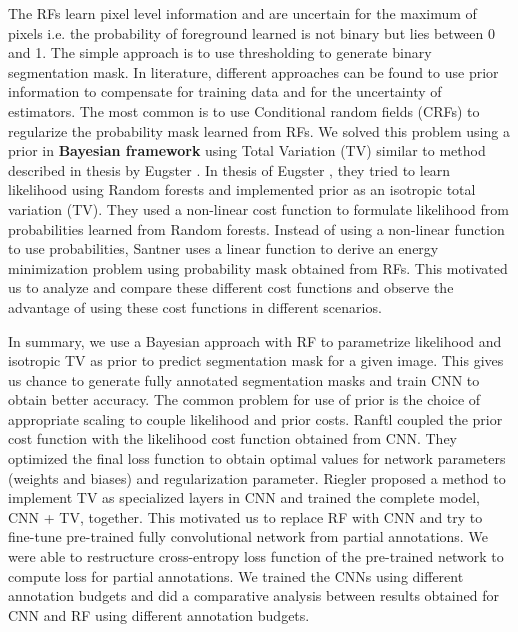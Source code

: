 The RFs learn pixel level information and are uncertain for the maximum of pixels i.e. the probability of foreground learned is not binary but lies between 0 and 1. The simple approach is to use thresholding to generate binary segmentation mask. In literature, different approaches can be found to use prior information to compensate for training data and for the uncertainty of estimators. The most common is to use Conditional random fields (CRFs) to regularize the probability mask learned from RFs. We solved this problem using a prior in \textbf{Bayesian framework} using Total Variation (TV) similar to method described in thesis by Eugster \cite{dominic}. In thesis of Eugster \cite{dominic}, they tried to learn likelihood using Random forests and implemented prior as an isotropic total variation (TV). They used a non-linear cost function to formulate likelihood from probabilities learned from Random forests. Instead of using a non-linear function to use probabilities, Santner \cite{santner:2009} uses a linear function to derive an energy minimization problem using probability mask obtained from RFs. This motivated us to analyze and compare these different cost functions and observe the advantage of using these cost functions in different scenarios. \par

In summary, we use a Bayesian approach with RF to parametrize likelihood and isotropic TV as prior to predict segmentation mask for a given image. This gives us chance to generate fully annotated segmentation masks and train CNN to obtain better accuracy. The common problem for use of prior is the choice of appropriate scaling to couple likelihood and prior costs. Ranftl \cite{ranftl:2014} coupled the prior cost function with the likelihood cost function obtained from CNN. They optimized the final loss function to obtain optimal values for network parameters (weights and biases) and regularization parameter. Riegler \cite{riegler:2016} \cite{riegler1:2016} proposed a method to implement TV as specialized layers in CNN and trained the complete model, CNN + TV, together. This motivated us to replace RF with CNN and try to fine-tune pre-trained fully convolutional network from partial annotations. We were able to restructure cross-entropy loss function of the pre-trained network to compute loss for partial annotations. We trained the CNNs using different annotation budgets and did a comparative analysis between results obtained for CNN and RF using different annotation budgets.


